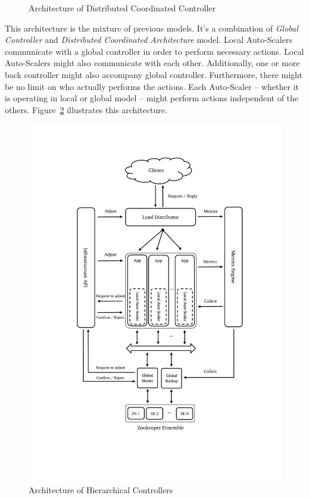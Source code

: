 \begin{description}[leftmargin=0pt]
\begin{figure}[hb]
        \caption{Architecture of Distributed Coordinated Controller}
        \label{fig:auto-scaler-dist-coord}
    \end{figure}
    \clearpage
    \item[Hierarchical Controllers] This architecture is the mixture of previous models. It's a combination of \emph{Global Controller} and \emph{Distributed Coordinated Architecture} model. Local Auto-Scalers communicate with a global controller in order to perform necessary actions. Local Auto-Scalers might also communicate with each other. Additionally, one or more back controller might also accompany global controller. Furthermore, there might be no limit on who actually performs the actions. Each Auto-Scaler -- whether it is operating in local or global model -- might perform actions independent of the others. Figure~\ref{fig:auto-scaler-hierar} illustrates this architecture.
    \begin{figure}[hb]
        \includegraphics[clip,trim=3cm 4.2cm 2.5cm 2.8cm,scale=0.8]{auto-scaler-hierarchy.pdf}
        \centering
        \caption{Architecture of Hierarchical Controllers}
        \label{fig:auto-scaler-hierar}
    \end{figure}
\end{description}

